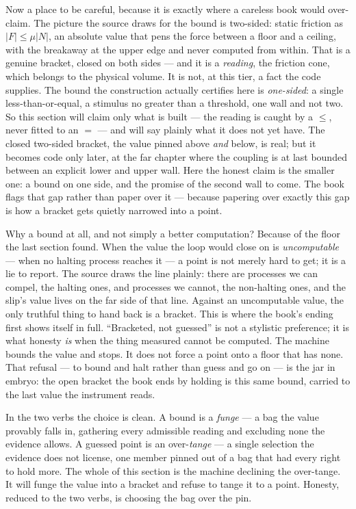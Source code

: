 Now a place to be careful, because it is exactly where a careless book would over-claim. The picture the source draws
for the bound is two-sided: static friction as \(|F| \le \mu|N|\), an absolute value that pens the force between a
floor and a ceiling, with the breakaway at the upper edge and never computed from within. That is a genuine bracket,
closed on both sides --- and it is a \emph{reading}, the friction cone, which belongs to the physical volume. It is not,
at this tier, a fact the code supplies. The bound the construction actually certifies here is \emph{one-sided}: a
single less-than-or-equal, a stimulus no greater than a threshold, one wall and not two. So this section will claim
only what is built --- the reading is caught by a \(\le\), never fitted to an \(=\) --- and will say plainly what it
does not yet have. The closed two-sided bracket, the value pinned above \emph{and} below, is real; but it becomes code
only later, at the far chapter where the coupling is at last bounded between an explicit lower and upper wall. Here the
honest claim is the smaller one: a bound on one side, and the promise of the second wall to come. The book flags that
gap rather than paper over it --- because papering over exactly this gap is how a bracket gets quietly narrowed into a
point.

Why a bound at all, and not simply a better computation? Because of the floor the last section found. When the value
the loop would close on is \emph{uncomputable} --- when no halting process reaches it --- a point is not merely hard to
get; it is a lie to report. The source draws the line plainly: there are processes we can compel, the halting ones, and
processes we cannot, the non-halting ones, and the slip's value lives on the far side of that line. Against an
uncomputable value, the only truthful thing to hand back is a bracket. This is where the book's ending first shows
itself in full. ``Bracketed, not guessed'' is not a stylistic preference; it is what honesty \emph{is} when the thing
measured cannot be computed. The machine bounds the value and stops. It does not force a point onto a floor that has
none. That refusal --- to bound and halt rather than guess and go on --- is the jar in embryo: the open bracket the
book ends by holding is this same bound, carried to the last value the instrument reads.

In the two verbs the choice is clean. A bound is a \emph{funge} --- a bag the value provably falls in, gathering every
admissible reading and excluding none the evidence allows. A guessed point is an over-\emph{tange} --- a single
selection the evidence does not license, one member pinned out of a bag that had every right to hold more. The whole of
this section is the machine declining the over-tange. It will funge the value into a bracket and refuse to tange it to
a point. Honesty, reduced to the two verbs, is choosing the bag over the pin.

